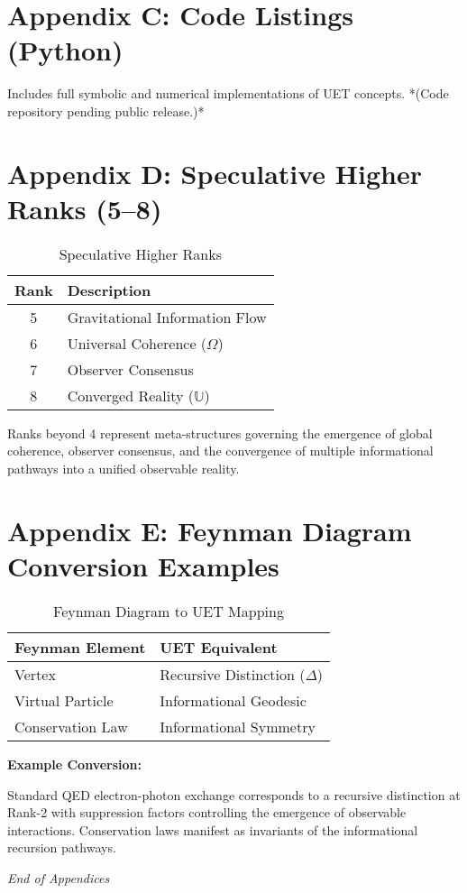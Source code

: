 \documentclass[12pt,a4paper]{article}
\begin{document}
\section{Appendix C: Code Listings (Python)}

Includes full symbolic and numerical implementations of UET concepts. *(Code repository pending public release.)*

\section{Appendix D: Speculative Higher Ranks (5–8)}

\begin{table}[h]
\centering
\begin{tabular}{|c|l|}
\hline
\textbf{Rank} & \textbf{Description} \\
\hline
5 & Gravitational Information Flow \\
6 & Universal Coherence (\(\Omega\)) \\
7 & Observer Consensus \\
8 & Converged Reality (\(\mathbb{U}\)) \\
\hline
\end{tabular}
\caption{Speculative Higher Ranks}
\end{table}

Ranks beyond 4 represent meta-structures governing the emergence of global coherence, observer consensus, and the convergence of multiple informational pathways into a unified observable reality.

\section{Appendix E: Feynman Diagram Conversion Examples}

\begin{table}[h]
\centering
\begin{tabular}{|l|l|}
\hline
\textbf{Feynman Element} & \textbf{UET Equivalent} \\
\hline
Vertex & Recursive Distinction (\(\Delta\)) \\
Virtual Particle & Informational Geodesic \\
Conservation Law & Informational Symmetry \\
\hline
\end{tabular}
\caption{Feynman Diagram to UET Mapping}
\end{table}

\textbf{Example Conversion:}

Standard QED electron-photon exchange corresponds to a recursive distinction at Rank-2 with suppression factors controlling the emergence of observable interactions. Conservation laws manifest as invariants of the informational recursion pathways.

\bigskip
\begin{center}
    \textit{End of Appendices}
\end{center}
\end{document}
